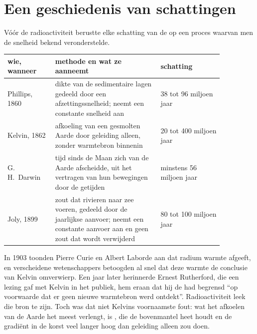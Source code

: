 \section{Een geschiedenis van schattingen}

Vóór de radioactiviteit berustte elke schatting van de  op een proces
waarvan men de snelheid bekend veronderstelde.

\begin{center}
\small
\begin{tabular}{|p{0.19\linewidth}|p{0.42\linewidth}|p{0.25\linewidth}|}
\hline
wie, wanneer & methode en wat ze aanneemt & schatting \\
\hline
Phillips, 1860 & dikte van de sedimentaire lagen gedeeld door een afzettingssnelheid; neemt een constante snelheid aan & 38 tot 96 miljoen jaar \\
Kelvin, 1862 & afkoeling van een gesmolten Aarde door geleiding alleen, zonder warmtebron binnenin & 20 tot 400 miljoen jaar \\
G.\,H.~Darwin & tijd sinds de Maan zich van de Aarde afscheidde, uit het vertragen van hun bewegingen door de getijden & minstens 56 miljoen jaar \\
Joly, 1899 & zout dat rivieren naar zee voeren, gedeeld door de jaarlijkse aanvoer; neemt een constante aanvoer aan en geen zout dat wordt verwijderd & 80 tot 100 miljoen jaar \\
\hline
\end{tabular}
\end{center}

\begin{history}
In 1903 toonden Pierre Curie en Albert Laborde aan dat radium warmte afgeeft,
en verscheidene wetenschappers betoogden al snel dat deze warmte de conclusie van Kelvin
omverwierp. Een jaar later herinnerde Ernest Rutherford, die een lezing gaf met Kelvin in
het publiek, hem eraan dat hij de  had begrensd
``op voorwaarde dat er geen nieuwe warmtebron werd ontdekt''. Radioactiviteit leek
die bron te zijn. Toch was dat niet Kelvins voornaamste fout: wat het afkoelen van de Aarde het meest verlengt,
is , die de bovenmantel heet houdt en de gradiënt in
de korst veel langer hoog dan geleiding alleen zou doen.
\end{history}

